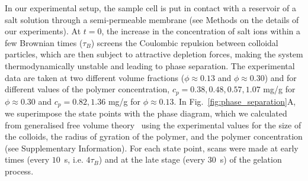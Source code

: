 \documentclass[12pt]{article}
\begin{document}
In our experimental setup, the sample cell is put in contact with a reservoir of a salt solution through a semi-permeable membrane (see Methods 
on the details of our experiments).
At $t=0$, the increase in the concentration of salt ions within a few Brownian times ($\tau_B$) screens the Coulombic repulsion between colloidal particles,
which are then subject to attractive depletion forces, making the system thermodynamically unstable and leading to phase separation. 
The experimental data are taken at two different volume fractions ($\phi\approx 0.13$ and $\phi\approx 0.30$) and for different values
of the polymer concentration, $c_p=0.38,0.48,0.57,1.07$ mg/g for $\phi\approx 0.30$ and $c_p=0.82,1.36$ mg/g for $\phi\approx 0.13$.
In Fig.~\ref{fig:phase_separation}A, we superimpose the state points with the phase diagram, which we calculated from generalised free volume theory~\cite{Fleer2008} using the experimental values for the size of the colloids, the radius of gyration of the polymer, and the polymer concentration (see Supplementary Information).
For each state point, scans were made at early times (every $10$~s, i.e. $4\tau_B$) and at the late stage (every $30$~s) of the gelation process. 
\end{document}
